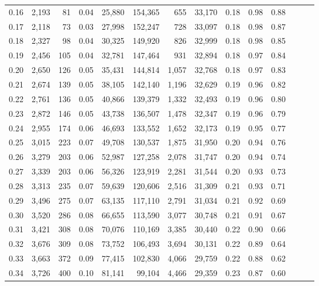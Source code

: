 \begin{tabular}{rrrrrrrrrrrrrr}
0.16 &  2,193 &   81 &  0.04 &   25,880 &  154,365 &     655 &  33,170 &  0.18 &  0.98 &      0.88 \\
0.17 &  2,118 &   73 &  0.03 &   27,998 &  152,247 &     728 &  33,097 &  0.18 &  0.98 &      0.87 \\
0.18 &  2,327 &   98 &  0.04 &   30,325 &  149,920 &     826 &  32,999 &  0.18 &  0.98 &      0.85 \\
0.19 &  2,456 &  105 &  0.04 &   32,781 &  147,464 &     931 &  32,894 &  0.18 &  0.97 &      0.84 \\
0.20 &  2,650 &  126 &  0.05 &   35,431 &  144,814 &   1,057 &  32,768 &  0.18 &  0.97 &      0.83 \\
0.21 &  2,674 &  139 &  0.05 &   38,105 &  142,140 &   1,196 &  32,629 &  0.19 &  0.96 &      0.82 \\
0.22 &  2,761 &  136 &  0.05 &   40,866 &  139,379 &   1,332 &  32,493 &  0.19 &  0.96 &      0.80 \\
0.23 &  2,872 &  146 &  0.05 &   43,738 &  136,507 &   1,478 &  32,347 &  0.19 &  0.96 &      0.79 \\
0.24 &  2,955 &  174 &  0.06 &   46,693 &  133,552 &   1,652 &  32,173 &  0.19 &  0.95 &      0.77 \\
0.25 &  3,015 &  223 &  0.07 &   49,708 &  130,537 &   1,875 &  31,950 &  0.20 &  0.94 &      0.76 \\
0.26 &  3,279 &  203 &  0.06 &   52,987 &  127,258 &   2,078 &  31,747 &  0.20 &  0.94 &      0.74 \\
0.27 &  3,339 &  203 &  0.06 &   56,326 &  123,919 &   2,281 &  31,544 &  0.20 &  0.93 &      0.73 \\
0.28 &  3,313 &  235 &  0.07 &   59,639 &  120,606 &   2,516 &  31,309 &  0.21 &  0.93 &      0.71 \\
0.29 &  3,496 &  275 &  0.07 &   63,135 &  117,110 &   2,791 &  31,034 &  0.21 &  0.92 &      0.69 \\
0.30 &  3,520 &  286 &  0.08 &   66,655 &  113,590 &   3,077 &  30,748 &  0.21 &  0.91 &      0.67 \\
0.31 &  3,421 &  308 &  0.08 &   70,076 &  110,169 &   3,385 &  30,440 &  0.22 &  0.90 &      0.66 \\
0.32 &  3,676 &  309 &  0.08 &   73,752 &  106,493 &   3,694 &  30,131 &  0.22 &  0.89 &      0.64 \\
0.33 &  3,663 &  372 &  0.09 &   77,415 &  102,830 &   4,066 &  29,759 &  0.22 &  0.88 &      0.62 \\
0.34 &  3,726 &  400 &  0.10 &   81,141 &   99,104 &   4,466 &  29,359 &  0.23 &  0.87 &      0.60 \\

\end{tabular}
